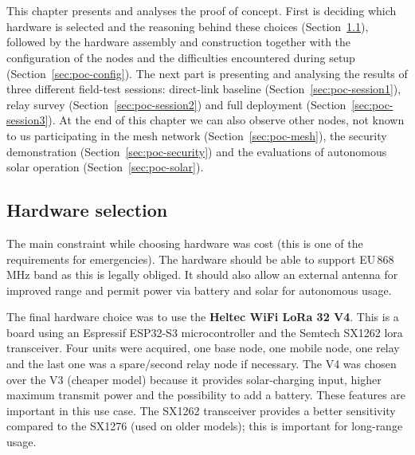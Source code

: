 
\chapter{}%
\label{ch:poc}

This chapter presents and analyses the proof of concept.
First is deciding which hardware is selected and the reasoning behind these choices (Section~\ref{sec:poc-hardware}), followed by the
hardware assembly and construction together with the configuration of the nodes and the difficulties encountered during setup (Section~\ref{sec:poc-config}).
The next part is presenting and analysing the results of three different field-test sessions: direct-link baseline (Section~\ref{sec:poc-session1}), relay survey (Section~\ref{sec:poc-session2}) and full deployment (Section~\ref{sec:poc-session3}).
At the end of this chapter we can also observe other nodes, not known to us participating in the mesh network (Section~\ref{sec:poc-mesh}), the security demonstration (Section~\ref{sec:poc-security}) and the evaluations of autonomous solar operation (Section~\ref{sec:poc-solar}).

\section{Hardware selection}%
\label{sec:poc-hardware}

The main constraint while choosing hardware was cost (this is one of the requirements for emergencies).
The hardware should be able to support EU\,868\,MHz band as this is legally obliged. It should also allow an external antenna for improved range and permit power via battery and solar for autonomous usage.

The final hardware choice was to use the \textbf{Heltec WiFi LoRa 32 V4}. This is a board using an Espressif ESP32-S3 microcontroller and the Semtech SX1262 \gls{lora} transceiver.
Four units were acquired, one base node, one mobile node, one relay and the last one was a spare/second relay node if necessary.
The V4 was chosen over the V3 (cheaper model) because it provides solar-charging input, higher maximum transmit power and the possibility to add a battery.
These features are important in this use case. 
The SX1262 transceiver provides a better sensitivity compared to the SX1276 (used on older models); this is important for long-range usage.

